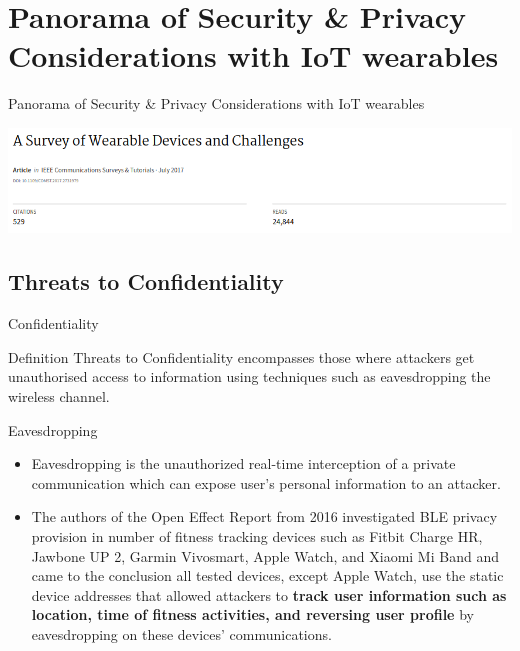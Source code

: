 \documentclass[ucs,9pt]{beamer}
\begin{document}
\section{Panorama of Security \& Privacy Considerations with IoT wearables}

\begin{frame}[fragile]{Panorama of Security \& Privacy Considerations with IoT wearables}

\includegraphics[width=1\linewidth]{imgs/ASurveyofWearableDevicesandChallenges}

\end{frame}


\subsection{Threats to Confidentiality}

\begin{frame}{Confidentiality}
	\begin{alertblock}{Definition}
	Threats to Confidentiality encompasses those where attackers get unauthorised  access to information using techniques such as eavesdropping  the wireless channel.	
	\end{alertblock}
	
	
	
\end{frame}

\begin{frame}{Eavesdropping}
	\begin{itemize}
		\item Eavesdropping is the unauthorized real-time interception of a private communication which can expose user’s personal information to an attacker.
		\item The authors of the Open Effect Report from 2016 \cite{b7} investigated BLE privacy provision in number of fitness tracking devices such as Fitbit Charge HR, Jawbone UP 2, Garmin Vivosmart, 	Apple Watch, and Xiaomi Mi Band and came to the conclusion all tested devices, except Apple Watch, use the static device addresses that allowed attackers to \textbf{track user information such as location, time of fitness activities, and reversing user profile} by eavesdropping on these devices’ communications.
	\end{itemize}
\end{frame}
\end{document}
